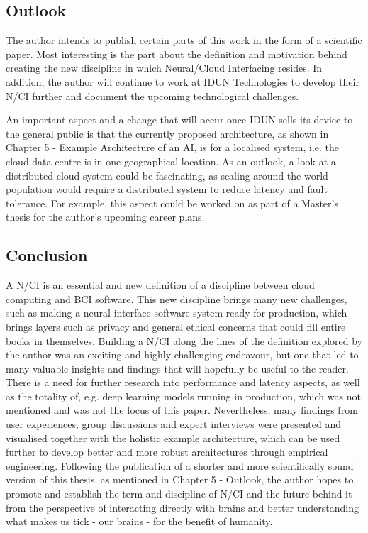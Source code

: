 \subsection{Outlook}
\label{chapter5-outlook}

The author intends to publish certain parts of this work in the form of a scientific paper. Most interesting is the part about the definition and motivation behind creating the new discipline in which Neural/Cloud Interfacing resides. In addition, the author will continue to work at IDUN Technologies to develop their N/CI further and document the upcoming technological challenges.

An important aspect and a change that will occur once IDUN sells its device to the general public is that the currently proposed architecture, as shown in Chapter 5 - Example Architecture of an AI, is for a localised system, i.e. the cloud data centre is in one geographical location. As an outlook, a look at a distributed cloud system could be fascinating, as scaling around the world population would require a distributed system to reduce latency and fault tolerance. For example, this aspect could be worked on as part of a Master's thesis for the author's upcoming career plans.

\subsection{Conclusion}
\label{chapter5-conclusion}

A N/CI is an essential and new definition of a discipline between cloud computing and BCI software. This new discipline brings many new challenges, such as making a neural interface software system ready for production, which brings layers such as privacy and general ethical concerns that could fill entire books in themselves. Building a N/CI along the lines of the definition explored by the author was an exciting and highly challenging endeavour, but one that led to many valuable insights and findings that will hopefully be useful to the reader. There is a need for further research into performance and latency aspects, as well as the totality of, e.g. deep learning models running in production, which was not mentioned and was not the focus of this paper. Nevertheless, many findings from user experiences, group discussions and expert interviews were presented and visualised together with the holistic example architecture, which can be used further to develop better and more robust architectures through empirical engineering. Following the publication of a shorter and more scientifically sound version of this thesis, as mentioned in Chapter 5 - Outlook, the author hopes to promote and establish the term and discipline of N/CI and the future behind it from the perspective of interacting directly with brains and better understanding what makes us tick - our brains - for the benefit of humanity.

